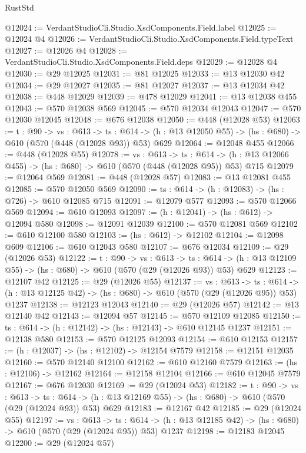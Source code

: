 \begin{lexlean}{RustStd}
\begin{coremodule}
@12024 := VerdantStudioCli.Studio.XsdComponents.Field.label
@12025 := @12024 @4
@12026 := VerdantStudioCli.Studio.XsdComponents.Field.typeText
@12027 := @12026 @4
@12028 := VerdantStudioCli.Studio.XsdComponents.Field.deps
@12029 := @12028 @4
@12030 := @29 @12025
@12031 := @81 @12025
@12033 := @13 @12030 @42
@12034 := @29 @12027
@12035 := @81 @12027
@12037 := @13 @12034 @42
@12038 := @448 @12029
@12039 := @478 @12029
@12041 := @13 @12038 @455
@12043 := @570 @12038 @569
@12045 := @570 @12034 @12043
@12047 := @570 @12030 @12045
@12048 := @676 @12038
@12050 := @448 (@12028 @53)
@12063 := {t : @90} ->
  {vs : @613} ->
  {ts : @614} -> (h : @13 @12050 @55) -> (hs : @680) -> @610 (@570 (@448 (@12028 @93)) @53) @629
@12064 := @12048 @455
@12066 := @448 (@12028 @55)
@12078 := {vs : @613} ->
  {ts : @614} -> (h : @13 @12066 @455) -> (hs : @680) -> @610 (@570 (@448 (@12028 @95)) @53) @715
@12079 := @12064 @569
@12081 := @448 (@12028 @57)
@12083 := @13 @12081 @455
@12085 := @570 @12050 @569
@12090 := {ts : @614} -> (h : @12083) -> (hs : @726) -> @610 @12085 @715
@12091 := @12079 @577
@12093 := @570 @12066 @569
@12094 := @610 @12093
@12097 := (h : @12041) -> (hs : @612) -> @12094 @580
@12098 := @12091 @12039
@12100 := @570 @12081 @569
@12102 := @610 @12100 @580
@12103 := (hs : @612) -> @12102
@12104 := @12098 @609
@12106 := @610 @12043 @580
@12107 := @676 @12034
@12109 := @29 (@12026 @53)
@12122 := {t : @90} ->
  {vs : @613} ->
  {ts : @614} -> (h : @13 @12109 @55) -> (hs : @680) -> @610 (@570 (@29 (@12026 @93)) @53) @629
@12123 := @12107 @42
@12125 := @29 (@12026 @55)
@12137 := {vs : @613} ->
  {ts : @614} -> (h : @13 @12125 @42) -> (hs : @680) -> @610 (@570 (@29 (@12026 @95)) @53) @1237
@12138 := @12123 @12043
@12140 := @29 (@12026 @57)
@12142 := @13 @12140 @42
@12143 := @12094 @57
@12145 := @570 @12109 @12085
@12150 := {ts : @614} -> (h : @12142) -> (hs : @12143) -> @610 @12145 @1237
@12151 := @12138 @580
@12153 := @570 @12125 @12093
@12154 := @610 @12153
@12157 := (h : @12037) -> (hs : @12102) -> @12154 @7579
@12158 := @12151 @12035
@12160 := @570 @12140 @12100
@12162 := @610 @12160 @7579
@12163 := (hs : @12106) -> @12162
@12164 := @12158 @12104
@12166 := @610 @12045 @7579
@12167 := @676 @12030
@12169 := @29 (@12024 @53)
@12182 := {t : @90} ->
  {vs : @613} ->
  {ts : @614} -> (h : @13 @12169 @55) -> (hs : @680) -> @610 (@570 (@29 (@12024 @93)) @53) @629
@12183 := @12167 @42
@12185 := @29 (@12024 @55)
@12197 := {vs : @613} ->
  {ts : @614} -> (h : @13 @12185 @42) -> (hs : @680) -> @610 (@570 (@29 (@12024 @95)) @53) @1237
@12198 := @12183 @12045
@12200 := @29 (@12024 @57)

\end{coremodule}
\end{lexlean}
